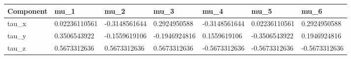 \begin{tabular}{@{}lllllll@{}}
\toprule
Component & mu\_1 & mu\_2 & mu\_3 & mu\_4 & mu\_5 & mu\_6 \\
\midrule
tau\_x & 0.02236110561 & -0.3148561644 & 0.2924950588 & -0.3148561644 & 0.02236110561 & 0.2924950588 \\
tau\_y & 0.3506543922 & -0.1559619106 & -0.1946924816 & 0.1559619106 & -0.3506543922 & 0.1946924816 \\
tau\_z & 0.5673312636 & 0.5673312636 & 0.5673312636 & -0.5673312636 & -0.5673312636 & -0.5673312636 \\
\bottomrule
\end{tabular}
